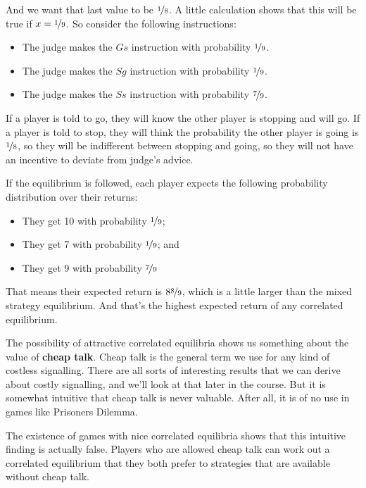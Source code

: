 \documentclass[
  11pt,
  letterpaper,
]{scrbook}
\providecommand{\tightlist}{%
  \setlength{\itemsep}{0pt}\setlength{\parskip}{0pt}}
\begin{document}
And we want that last value to be \(\nicefrac{1}{8}\). A little
calculation shows that this will be true if \(x = \nicefrac{1}{9}\). So
consider the following instructions:

\begin{itemize}
\tightlist
\item
  The judge makes the \(Gs\) instruction with probability
  \(\nicefrac{1}{9}\).
\item
  The judge makes the \(Sg\) instruction with probability
  \(\nicefrac{1}{9}\).
\item
  The judge makes the \(Ss\) instruction with probability
  \(\nicefrac{7}{9}\).
\end{itemize}

If a player is told to go, they will know the other player is stopping
and will go. If a player is told to stop, they will think the
probability the other player is going is \(\nicefrac{1}{8}\), so they
will be indifferent between stopping and going, so they will not have an
incentive to deviate from judge's advice.

If the equilibrium is followed, each player expects the following
probability distribution over their returns:

\begin{itemize}
\tightlist
\item
  They get 10 with probability \(\nicefrac{1}{9}\);
\item
  They get 7 with probability \(\nicefrac{1}{9}\); and
\item
  They get 9 with probability \(\nicefrac{7}{9}\)
\end{itemize}

That means their expected return is \(8\nicefrac{8}{9}\), which is a
little larger than the mixed strategy equilibrium. And that's the
highest expected return of any correlated equilibrium.

The possibility of attractive correlated equilibria shows us something
about the value of \textbf{cheap talk}. Cheap talk is the general term
we use for any kind of costless signalling. There are all sorts of
interesting results that we can derive about costly signalling, and
we'll look at that later in the course. But it is somewhat intuitive
that cheap talk is never valuable. After all, it is of no use in games
like Prisoners Dilemma.

The existence of games with nice correlated equilibria shows that this
intuitive finding is actually false. Players who are allowed cheap talk
can work out a correlated equilibrium that they both prefer to
strategies that are available without cheap talk.
\end{document}
